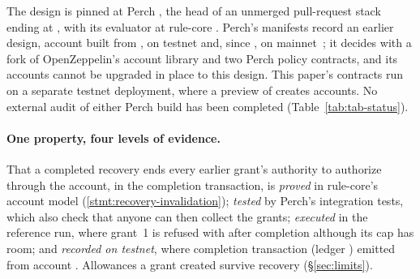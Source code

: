 The design is pinned at Perch , the head of an unmerged
pull-request stack ending at , with its evaluator at
rule-core . Perch's manifests record an earlier design,
account  built from
, on testnet and, since
, on mainnet~; it
decides with a fork of OpenZeppelin's account library and two Perch policy
contracts, and its accounts cannot be upgraded in place to this design. This
paper's contracts run on a separate testnet deployment, where a preview of
 creates accounts. No external audit of either Perch build has
been completed (Table~\ref{tab:tab-status}).


\paragraph{One property, four levels of evidence.} That a completed recovery ends
every earlier grant's authority to authorize through the account, in the
completion transaction, is \emph{proved} in rule-core's account model
(\ref{stmt:recovery-invalidation}); \emph{tested} by Perch's integration tests,
which also check that anyone can then collect the grants; \emph{executed} in the
reference run, where grant~1 is refused with  after completion
although its cap has room; and \emph{recorded on testnet}, where completion
transaction  (ledger ) emitted
 from account . Allowances
a grant created survive recovery (\S\ref{sec:limits}).
